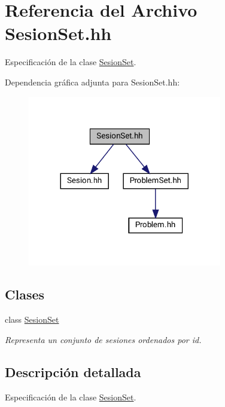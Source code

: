 \hypertarget{_sesion_set_8hh}{}\section{Referencia del Archivo Sesion\+Set.\+hh}
\label{_sesion_set_8hh}


Especificación de la clase \mbox{\hyperlink{class_sesion_set}{Sesion\+Set}}.  


Dependencia gráfica adjunta para Sesion\+Set.\+hh\+:\nopagebreak
\begin{figure}[H]
\begin{center}
\leavevmode
\includegraphics[width=240pt]{_sesion_set_8hh__incl}
\end{center}
\end{figure}
\subsection*{Clases}
\begin{DoxyCompactItemize}
\item 
class \mbox{\hyperlink{class_sesion_set}{Sesion\+Set}}
\begin{DoxyCompactList}\small\item\em Representa un conjunto de sesiones ordenados por id. \end{DoxyCompactList}\end{DoxyCompactItemize}


\subsection{Descripción detallada}
Especificación de la clase \mbox{\hyperlink{class_sesion_set}{Sesion\+Set}}. 

